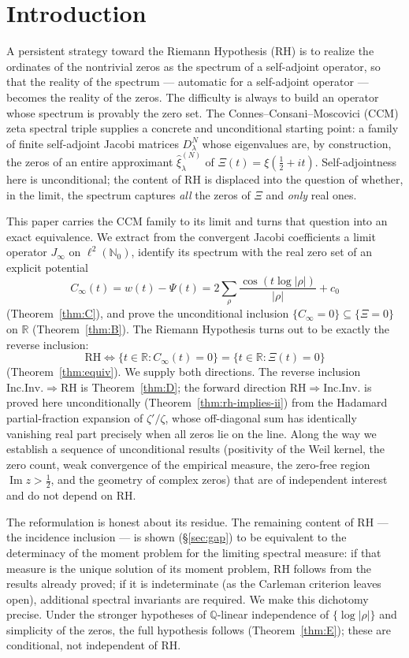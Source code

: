 \documentclass[11pt]{amsart}
\theoremstyle{definition}
\theoremstyle{remark}
\newcommand{\RH}{\mathrm{RH}}
\renewcommand{\Im}{\operatorname{Im}}
\newcommand{\half}{\tfrac12}
\newcommand{\Cinf}{C_\infty}
\newcommand{\Jinf}{J_\infty}
\begin{document}
\section{Introduction}

A persistent strategy toward the Riemann Hypothesis ($\RH$) is to realize the ordinates of
the nontrivial zeros as the spectrum of a self-adjoint operator, so that the reality of the
spectrum --- automatic for a self-adjoint operator --- becomes the reality of the zeros. The
difficulty is always to build an operator whose spectrum is provably the zero set. The
Connes--Consani--Moscovici (CCM) zeta spectral triple \cite{CCM} supplies a concrete and
unconditional starting point: a family of finite self-adjoint Jacobi matrices $D_\lambda^N$
whose eigenvalues are, by construction, the zeros of an entire approximant
$\widehat\xi_\lambda^{(N)}$ of $\Xi(t)=\xi(\half+it)$. Self-adjointness here is unconditional;
the content of $\RH$ is displaced into the question of whether, in the limit, the spectrum
captures \emph{all} the zeros of $\Xi$ and \emph{only} real ones.

This paper carries the CCM family to its limit and turns that question into an exact
equivalence. We extract from the convergent Jacobi coefficients a limit operator $\Jinf$ on
$\ell^2(\mathbb N_0)$, identify its spectrum with the real zero set of an explicit potential
\[
\Cinf(t)=w(t)-\Psi(t)=2\sum_\rho\frac{\cos(t\log|\rho|)}{|\rho|}+c_0
\]
(Theorem~\ref{thm:C}), and prove the unconditional inclusion $\{\Cinf=0\}\subseteq\{\Xi=0\}$
on $\mathbb R$ (Theorem~\ref{thm:B}). The Riemann Hypothesis turns out to be exactly the
reverse inclusion:
\[
\boxed{\ \RH\iff\big\{t\in\mathbb R:\Cinf(t)=0\big\}=\big\{t\in\mathbb R:\Xi(t)=0\big\}\ }
\]
(Theorem~\ref{thm:equiv}). We supply both directions. The reverse inclusion
$\mathrm{Inc.Inv.}\Rightarrow\RH$ is Theorem~\ref{thm:D}; the forward direction
$\RH\Rightarrow\mathrm{Inc.Inv.}$ is proved here unconditionally
(Theorem~\ref{thm:rh-implies-ii}) from the Hadamard partial-fraction expansion of
$\zeta'/\zeta$, whose off-diagonal sum has identically vanishing real part precisely when all
zeros lie on the line. Along the way we establish a sequence of unconditional results
(positivity of the Weil kernel, the zero count, weak convergence of the empirical measure,
the zero-free region $\Im z>\half$, and the geometry of complex zeros) that are of independent
interest and do not depend on $\RH$.

The reformulation is honest about its residue. The remaining content of $\RH$ --- the
incidence inclusion --- is shown (\S\ref{sec:gap}) to be equivalent to the determinacy of the
moment problem for the limiting spectral measure: if that measure is the unique solution of
its moment problem, $\RH$ follows from the results already proved; if it is indeterminate
(as the Carleman criterion leaves open), additional spectral invariants are required. We make
this dichotomy precise. Under the stronger hypotheses of $\mathbb Q$-linear independence of
$\{\log|\rho|\}$ and simplicity of the zeros, the full hypothesis follows
(Theorem~\ref{thm:E}); these are conditional, not independent of $\RH$.
\end{document}
